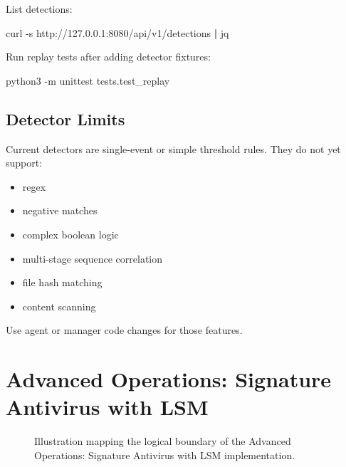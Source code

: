 \documentclass[
  12pt,
]{report}
\newenvironment{Shaded}{}{}
\newcommand{\AttributeTok}[1]{\textcolor[rgb]{0.49,0.56,0.16}{#1}}
\newcommand{\ExtensionTok}[1]{#1}
\newcommand{\KeywordTok}[1]{\textcolor[rgb]{0.00,0.44,0.13}{\textbf{#1}}}
\newcommand{\NormalTok}[1]{#1}
\providecommand{\tightlist}{%
  \setlength{\itemsep}{0pt}\setlength{\parskip}{0pt}}
\begin{document}
List detections:

\begin{Shaded}
\begin{Highlighting}[]
\ExtensionTok{curl} \AttributeTok{{-}s}\NormalTok{ http://127.0.0.1:8080/api/v1/detections }\KeywordTok{|} \ExtensionTok{jq}
\end{Highlighting}
\end{Shaded}

Run replay tests after adding detector fixtures:

\begin{Shaded}
\begin{Highlighting}[]
\ExtensionTok{python3} \AttributeTok{{-}m}\NormalTok{ unittest tests.test\_replay}
\end{Highlighting}
\end{Shaded}

\section{Detector Limits}\label{detector-limits}

Current detectors are single-event or simple threshold rules. They do
not yet support:

\begin{itemize}
\tightlist
\item
  regex
\item
  negative matches
\item
  complex boolean logic
\item
  multi-stage sequence correlation
\item
  file hash matching
\item
  content scanning
\end{itemize}

Use agent or manager code changes for those features.

\clearpage

\chapter{Advanced Operations: Signature Antivirus with
LSM}\label{advanced-operations-signature-antivirus-with-lsm}

\begin{figure}[h]
\centering
\vspace{5cm}
\caption{Illustration mapping the logical boundary of the Advanced Operations: Signature Antivirus with LSM implementation.}
\end{figure}
\end{document}
